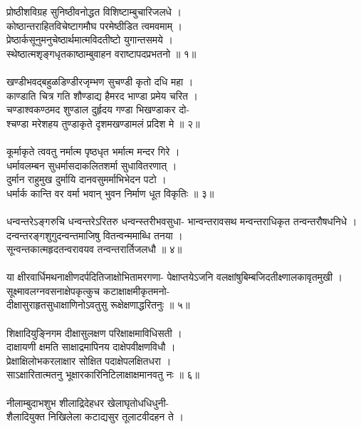 प्रोष्ठीशविग्रह सुनिष्ठीवनोद्धत विशिष्टाम्बुचारिजलधे  ।\\
कोष्ठान्तराहितविचेष्टागमौघ परमेष्ठीडित त्वमवमाम्  ।\\
प्रेष्ठार्कसूनुमनुचेष्ठार्थमात्मविदतीष्टो युगान्तसमये  ।\\
स्थेष्ठात्मश‍ृङ्गधृतकाष्ठाम्बुवाहन वराष्टापदप्रभतनो  ॥ १॥\\
\\
खण्डीभवद्बहुळडिण्डीरजृम्भण सुचण्डी कृतो दधि महा  ।\\
काण्डाति चित्र गति शौण्डाद्य हैमरद भाण्डा प्रमेय चरित  ।\\
चण्डाश्वकण्ठमद शुण्डाल दुर्हृदय गण्डा भिखण्डाकर दो-\\
श्चण्डा मरेशहय तुण्डाकृते दृशमखण्डामलं प्रदिश मे  ॥ २॥\\
\\
कूर्माकृते त्ववतु नर्मात्म पृष्ठधृत भर्मात्म मन्दर गिरे  ।\\
धर्मावलम्बन सुधर्मासदाकलितशर्मा सुधावितरणात्  ।\\
दुर्मान राहुमुख दुर्मायि दानवसुमर्माभिभेदन पटो  ।\\
धर्मार्क कान्ति वर वर्मा भवान् भुवन निर्माण धूत विकृतिः  ॥ ३॥\\
\\
धन्वन्तरेऽङ्गरुचि धन्वन्तरेऽरितरु धन्वन्स्तरीभवसुधा-
भान्वन्तरावसथ मन्वन्तराधिकृत तन्वन्तरौषधनिधे  ।\\
दन्वन्तरङ्गशुगुदन्वन्तमाजिषु वितन्वन्ममाब्धि तनया  ।\\
सून्वन्तकात्महृदतन्वरावयव तन्वन्तरार्तिजलधौ  ॥ ४॥\\
\\
या क्षीरवार्धिमथनाक्षीणदर्पदितिजाक्षोभितामरगणा-
पेक्षाप्तयेऽजनि वलक्षांषुबिम्बजिदतीक्ष्णालकावृतमुखी  ।\\
सूक्ष्मावलग्नवसनाक्षेपकृत्कुच कटाक्षाक्षमीकृतमनो-\\
दीक्षासुराहृतसुधाक्षाणिनोऽवतुसु रूक्षेक्षणाद्धरितनुः  ॥ ५॥\\
\\
शिक्षादियुङ्निगम दीक्षासुलक्षण परिक्षाक्षमाविधिसती  ।\\
दाक्षायणी क्षमति साक्षाद्रमापिनय दाक्षेपवीक्षणविधौ  ।\\
प्रेक्षाक्षिलोभकरलाक्षार सोक्षित पदाक्षेपलक्षितधरा  ।\\
साऽक्षारितात्मतनु भूक्षारकारिनिटिलाक्षाक्षमानवतु नः  ॥ ६॥\\
\\
नीलाम्बुदाभशुभ शीलाद्रिदेहधर खेलाघृतोधधिधुनी-\\
शैलादियुक्त निखिलेला कटाद्यसुर तूलाटवीदहन ते  ।\\
